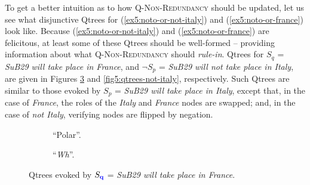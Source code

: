 \begin{exe}
	\ex \label{ex5:diff-gran-disj}
	\begin{xlist}
		\label{ex5:noto-or-not-italy}
		\label{ex5:noto-or-france}
	\end{xlist}
\end{exe}

To get a better intuition as to how \textsc{Q-Non-Redundancy} should be updated, let us see what disjunctive Qtrees for (\ref{ex5:noto-or-not-italy}) and (\ref{ex5:noto-or-france}) look like. Because (\ref{ex5:noto-or-not-italy}) and (\ref{ex5:noto-or-france}) are felicitous, at least some of these Qtrees should be well-formed -- providing information about what \textsc{Q-Non-Redundancy} should \textit{rule-in}. Qtrees for $S_q$ = \textit{SuB29 will take place in France}, and $\neg S_p$ = \textit{SuB29 will not take place in Italy}, are given in Figures \ref{fig5:qtrees-france} and \ref{fig5:qtrees-not-italy}, respectively. Such Qtrees are similar to those evoked by $S_p$ = \textit{SuB29 will take place in Italy}, except that, in the case of \textit{France}, the roles of the \textit{Italy} and \textit{France} nodes are swapped; and, in the case of \textit{not Italy}, verifying nodes are flipped by negation.

\begin{figure}[H]
	\centering
	\begin{subfigure}[b]{.45\linewidth}
		\centering
		\caption[]{``Polar''.}\label{fig5:qtree-france-polar}
	\end{subfigure}\hfill
	\begin{subfigure}[b]{.45\linewidth}
		\centering
		\caption[]{``\textit{Wh}''.}\label{fig5:qtree-france-wh}
	\end{subfigure}
	\caption[]{Qtrees evoked by $S_{\textbf{\textcolor{blue}{q}}}$ = \textit{SuB29 will take place in France}.}\label{fig5:qtrees-france}
\end{figure}

